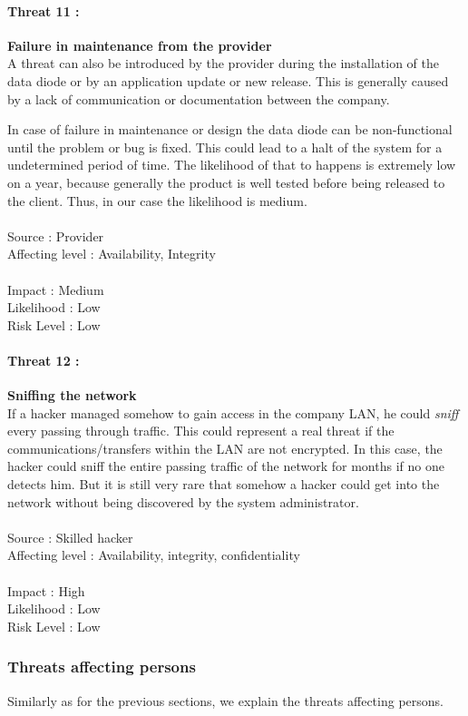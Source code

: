 \documentclass[a4paper,10pt]{article}
\begin{document}
\paragraph{Threat 11 :}  \textbf{Failure in maintenance from the provider}\\
\indent A threat can also be introduced by the provider during the installation of the data diode or by an application update or new release. This is generally caused by a lack of communication or documentation between the company.

In case of failure in maintenance or design the data diode can be non-functional until the problem or bug is fixed. This could lead to a halt of the system for a undetermined period of time. The likelihood of that to happens is extremely low on a year, because generally the product is well tested before being released to the client. Thus, in our case the likelihood is medium.  \\  \\ 
Source : Provider \\ 
Affecting level : Availability, Integrity  \\ \\
Impact : Medium \\
Likelihood : Low \\
Risk Level : Low


\paragraph{Threat 12 :}  \textbf{Sniffing the network} \\
\indent If a hacker managed somehow to gain access in the company LAN, he could \emph{sniff} every passing through traffic. This could represent a real threat if the communications/transfers within the LAN are not encrypted. In this case, the hacker could sniff the entire passing traffic of the network for months if no one detects him. But it is still very rare that somehow a hacker could get into the network without being discovered by the system administrator.\\  \\ 
Source : Skilled hacker \\ 
Affecting level : Availability, integrity, confidentiality \\ \\
Impact : High \\
Likelihood : Low \\
Risk Level : Low


\subsubsection{Threats affecting persons}
Similarly as for the previous sections, we explain the threats affecting persons.
\end{document}
